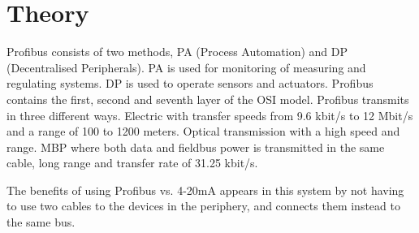 \newpage
\section{Theory}
Profibus consists of two methods, PA (Process Automation) and DP (Decentralised Peripherals). PA is used for monitoring of measuring and regulating systems. DP is used to operate sensors and actuators. Profibus contains the first, second and seventh layer of the OSI model. Profibus transmits in three different ways. Electric with transfer speeds from 9.6 kbit/s to 12 Mbit/s and a range of 100 to 1200 meters. Optical transmission with a high speed and range. MBP where both data and fieldbus power is transmitted in the same cable, long range and transfer rate of 31.25 kbit/s.

The benefits of using Profibus vs. 4-20mA appears in this system by not having to use two cables to the devices in the periphery, and connects them instead to the same bus.